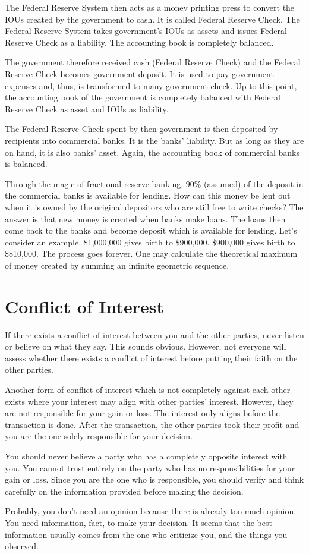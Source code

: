 \documentclass[a4paper]{report}
\begin{document}
The Federal Reserve System then acts as a money printing press to convert the IOUs created by the government to cash. It is called Federal Reserve Check. The Federal Reserve System takes government's IOUs as assets and issues Federal Reserve Check as a liability. The accounting book is completely balanced.

The government therefore received cash (Federal Reserve Check) and the Federal Reserve Check becomes government deposit. It is used to pay government expenses and, thus, is transformed to many government check. Up to this point, the accounting book of the government is completely balanced with Federal Reserve Check as asset and IOUs as liability.

The Federal Reserve Check spent by then government is then deposited by recipients into commercial banks. It is the banks' liability. But as long as they are on hand, it is also banks' asset. Again, the accounting book of commercial banks is balanced.

Through the magic of fractional-reserve banking, 90\% (assumed) of the deposit in the commercial banks is available for lending. How can this money be lent out when it is owned by the original depositors who are still free to write checks? The answer is that new money is created when banks make loans. The loans then come back to the banks and become deposit which is available for lending. Let's consider an example, \$1,000,000 gives birth to \$900,000. \$900,000 gives birth to \$810,000. The process goes forever. One may calculate the theoretical maximum of money created by summing an infinite geometric sequence.

\chapter{Conflict of Interest}
If there exists a conflict of interest between you and the other parties, never listen or believe on what they say. This sounds obvious. However, not everyone will assess whether there exists a conflict of interest before putting their faith on the other parties.

Another form of conflict of interest which is not completely against each other exists where your interest may align with other parties' interest. However, they are not responsible for your gain or loss. The interest only aligns before the transaction is done. After the transaction, the other parties took their profit and you are the one solely responsible for your decision.

You should never believe a party who has a completely opposite interest with you. You cannot trust entirely on the party who has no responsibilities for your gain or loss. Since you are the one who is responsible, you should verify and think carefully on the information provided before making the decision.

Probably, you don't need an opinion because there is already too much opinion. You need information, fact, to make your decision. It seems that the best information usually comes from the one who criticize you, and the things you observed.
\end{document}
